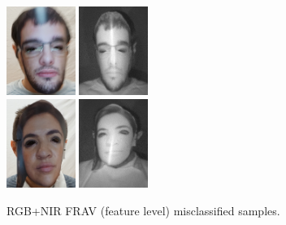 \begin{figure}[htb]
\centering
\includegraphics[width=0.2\textwidth]{images_databases/frav_rgb_151.JPG}
\includegraphics[width=0.2\textwidth]{images_databases/frav_nir_151.jpg}
\\
\includegraphics[width=0.2\textwidth]{images_databases/frav_rgb_128.JPG}
\includegraphics[width=0.2\textwidth]{images_databases/frav_nir_128.jpg}
\caption{RGB+NIR FRAV (feature level) misclassified samples.} \label{fig:frav_feat_miscl}
\end{figure}

